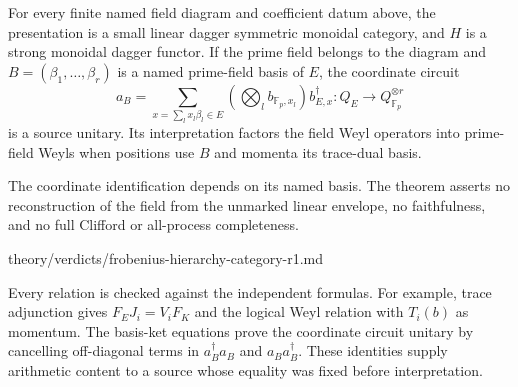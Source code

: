 \begin{theorem}\statusProved
For every finite named field diagram and coefficient datum above, the
presentation is a small linear dagger symmetric monoidal category, and
$H$ is a strong monoidal dagger functor. If the prime field belongs to the
diagram and $B=(\beta_1,\ldots,\beta_r)$ is a named prime-field basis of $E$,
the coordinate circuit
\[
 a_B=\sum_{x=\sum_lx_l\beta_l\in E}
        \left(\bigotimes_l b_{\mathbb F_p,x_l}\right)b_{E,x}^\dagger
       :Q_E\longrightarrow Q_{\mathbb F_p}^{\otimes r}
\]
is a source unitary. Its interpretation factors the field Weyl operators
into prime-field Weyls when positions use $B$ and momenta its trace-dual
basis.
\end{theorem}
\begin{scope}
The coordinate identification depends on its named basis. The theorem
asserts no reconstruction of the field from the unmarked linear envelope,
no faithfulness, and no full Clifford or all-process completeness.
\end{scope}
{theory/verdicts/frobenius-hierarchy-category-r1.md}

Every relation is checked against the independent formulas. For example,
trace adjunction gives $F_EJ_i=V_iF_K$ and the logical Weyl relation with
$T_i(b)$ as momentum. The basis-ket equations prove the coordinate circuit
unitary by cancelling off-diagonal terms in $a_B^\dagger a_B$ and
$a_Ba_B^\dagger$. These identities supply arithmetic content to a source
whose equality was fixed before interpretation.

